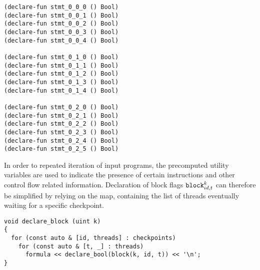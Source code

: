 \begin{lstlisting}[style=smtlib]
(declare-fun stmt_0_0_0 () Bool)
(declare-fun stmt_0_0_1 () Bool)
(declare-fun stmt_0_0_2 () Bool)
(declare-fun stmt_0_0_3 () Bool)
(declare-fun stmt_0_0_4 () Bool)

(declare-fun stmt_0_1_0 () Bool)
(declare-fun stmt_0_1_1 () Bool)
(declare-fun stmt_0_1_2 () Bool)
(declare-fun stmt_0_1_3 () Bool)
(declare-fun stmt_0_1_4 () Bool)

(declare-fun stmt_0_2_0 () Bool)
(declare-fun stmt_0_2_1 () Bool)
(declare-fun stmt_0_2_2 () Bool)
(declare-fun stmt_0_2_3 () Bool)
(declare-fun stmt_0_2_4 () Bool)
(declare-fun stmt_0_2_5 () Bool)
\end{lstlisting}



\noindent
In order to  repeated iteration of input programs,
the precomputed utility variables are used to indicate the presence of certain instructions and other control flow related information.
Declaration of block flags $\texttt{block}^k_{id, t}$ can therefore be simplified by relying on the  map,
containing the list of threads eventually waiting for a specific checkpoint.

\begin{lstlisting}[style=c++]
void declare_block (uint k)
{
  for (const auto & [id, threads] : checkpoints)
    for (const auto & [t, _] : threads)
      formula << declare_bool(block(k, id, t)) << '\n';
}
\end{lstlisting}

